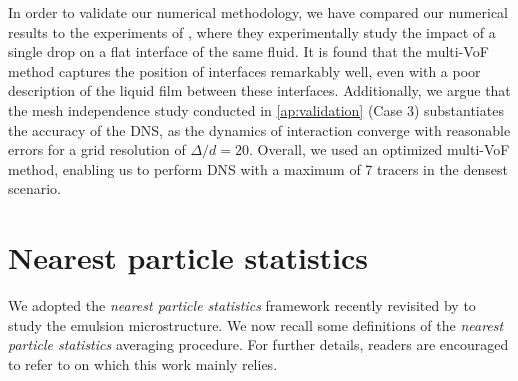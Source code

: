 \documentclass[11pt]{My_preprint}
\providecommand{\DIFadd}[1]{{\protect\color{blue}\uwave{#1}}} %
\providecommand{\DIFdel}[1]{{\protect\color{red}\sout{#1}}}                      %
\providecommand{\DIFaddbegin}{} %
\providecommand{\DIFaddend}{} %
\providecommand{\DIFdelbegin}{} %
\providecommand{\DIFdelend}{} %
\begin{document}
In order to validate our numerical methodology, we have compared our numerical results to the experiments of \citet{mohamed2003drop}, where they experimentally study the impact of a single drop on a flat interface of the same fluid. It is found that the multi-VoF method captures the position of interfaces remarkably well, even with a poor description of the liquid film between these interfaces.
Additionally, we argue that the mesh independence study conducted in \ref{ap:validation} (Case 3) substantiates the accuracy of the DNS, as the dynamics of interaction converge with reasonable errors for a grid resolution of \DIFdelbegin \DIFdel{$\Delta/d = 20$}\DIFdelend \DIFaddbegin \DIFadd{$d/\Delta = 25$}\DIFaddend . 
Overall, we used an optimized multi-VoF method, enabling us to perform DNS with a maximum of 7 tracers in the densest scenario. 





 
\section{Nearest particle statistics}
\label{sec:nearest}

We adopted the \textit{nearest particle statistics} framework recently revisited by \citet{zhang2021ensemble} to study the emulsion microstructure.
We now recall some definitions of the \textit{nearest particle statistics} averaging procedure. 
For further details, readers are encouraged to refer to \citet{zhang2021ensemble,zhang2023evolution} on which this work mainly relies.
\end{document}
